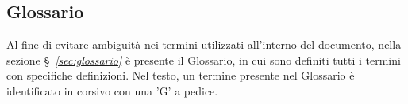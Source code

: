 \subsection{Glossario}
Al fine di evitare ambiguità nei termini utilizzati all'interno del documento, nella sezione \S~\textit{\ref{sec:glossario}} è presente il Glossario, in cui sono definiti tutti i termini con specifiche definizioni. Nel testo, un termine presente nel Glossario è identificato in corsivo con una 'G' a pedice.